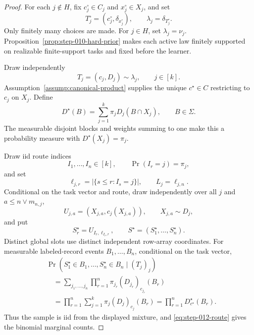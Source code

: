 \begin{proof}
For each \(j\notin H\), fix \(c_j^\circ\in C_j\) and
\(x_j^\circ\in X_j\), and set
\begin{equation}\label{eq:step-012-low-reference-task}
T_j^\circ=(c_j^\circ,\delta_{x_j^\circ}),
\qquad
\lambda_j=\delta_{T_j^\circ}.
\end{equation}
Only finitely many choices are made.  For \(j\in H\), set
\(\lambda_j=\nu_j\).  Proposition~\ref{prop:step-010-hard-prior} makes
each active law finitely supported on realizable finite-support tasks and
fixed before the learner.

Draw independently
\begin{equation}\label{eq:step-012-task-vector}
T_j=(c_j,D_j)\sim\lambda_j,
\qquad j\in[k].
\end{equation}
Assumption~\ref{assump:canonical-product} supplies the unique
\(c^\star\in C\) restricting to \(c_j\) on \(X_j\).  Define
\begin{equation}\label{eq:step-012-mixture-distribution}
D^\star(B)=\sum_{j=1}^k\pi_jD_j(B\cap X_j),
\qquad B\in\Sigma.
\end{equation}
The measurable disjoint blocks and weights summing to one make this a
probability measure with \(D^\star(X_j)=\pi_j\).

Draw iid route indices
\begin{equation}\label{eq:step-012-route}
I_1,\ldots,I_n\in[k],
\qquad\Pr(I_r=j)=\pi_j,
\end{equation}
and set
\begin{equation}\label{eq:step-012-route-counts}
\ell_{j,r}=|\{s\le r:I_s=j\}|,
\qquad L_j=\ell_{j,n}.
\end{equation}
Conditional on the task vector and route, draw independently over all
\(j\) and \(a\le n\vee m_{n,j}\),
\begin{equation}\label{eq:step-012-row-arrays}
U_{j,a}=(X_{j,a},c_j(X_{j,a})),
\qquad X_{j,a}\sim D_j,
\end{equation}
and put
\begin{equation}\label{eq:step-012-ideal-sample}
S_r^\star=U_{I_r,\ell_{I_r,r}},
\qquad S^\star=(S_1^\star,\ldots,S_n^\star).
\end{equation}
Distinct global slots use distinct independent row-array coordinates.  For
measurable labeled-record events \(B_1,\ldots,B_n\), conditional on the
task vector,
\begin{equation}\label{eq:step-012-iid-mixture-calculation}
\begin{split}
&\Pr(S_1^\star\in B_1,\ldots,S_n^\star\in B_n\mid(T_j)_j)\\
&\quad=\sum_{j_1,\ldots,j_n}
\prod_{r=1}^n\pi_{j_r}(D_{j_r})_{c_{j_r}}(B_r)\\
&\quad=\prod_{r=1}^n\sum_{j=1}^k
\pi_j(D_j)_{c_j}(B_r)
=\prod_{r=1}^nD^\star_{c^\star}(B_r).
\end{split}
\end{equation}
Thus the sample is iid from the displayed mixture, and
\eqref{eq:step-012-route} gives the binomial marginal counts.


\end{proof}
